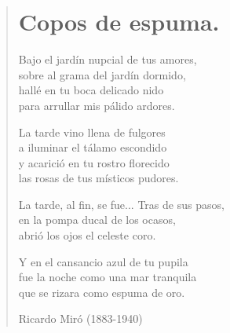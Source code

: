 \documentclass[12pt, twoside]{book}
\begin{document}
\begin{verse}
\begin{center}
\section{Copos de espuma.}
\end{center}

Bajo el jardín nupcial de tus amores,\\
sobre al grama del jardín dormido,\\
hallé en tu boca delicado nido\\
para arrullar mis pálido ardores.\newline

La tarde vino llena de fulgores\\
a iluminar el tálamo escondido\\
y acarició en tu rostro florecido\\
las rosas de tus místicos pudores.\newline

La tarde, al fin, se fue... Tras de sus pasos,\\
en la pompa ducal de los ocasos,\\
abrió los ojos el celeste coro.\newline

Y en el cansancio azul de tu pupila\\
fue la noche como una mar tranquila\\
que se rizara como espuma de oro.\newline

Ricardo Miró (1883-1940)

\end{verse}
\newpage
\end{document}

